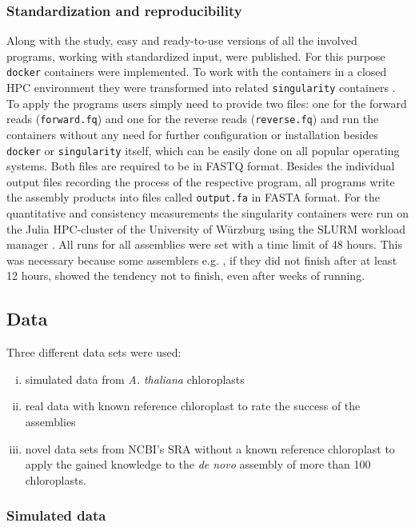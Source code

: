 \subsubsection{Standardization and reproducibility}

Along with the study, easy and ready-to-use versions of all the involved programs, working
with standardized input, were published. For this purpose \texttt{docker} containers
\cite{merkel2014docker} were implemented. To work with the containers in a closed HPC
environment they were transformed into related \texttt{singularity} containers
\cite{kurtzer2017singularity}. To apply the programs users simply need to provide two files:
one for the forward reads (\texttt{forward.fq}) and one for the reverse reads
(\texttt{reverse.fq}) and run the containers without any need for further configuration or
installation besides \texttt{docker} or \texttt{singularity} itself, which can be easily
done on all popular operating systems. Both files are required to be in FASTQ
format. Besides the individual output files recording the process of the respective
program, all programs write the assembly products into files called \texttt{output.fa} in
FASTA format. For the quantitative and consistency measurements the singularity containers
were run on the Julia HPC-cluster of the University of W\"{u}rzburg using the SLURM
workload manager \cite{Jette02slurm}. All runs for all assemblies were set with a time
limit of 48 hours. This was necessary because some assemblers e.g. \ioga, if they did not finish
after at least 12 hours, showed the tendency not to finish, even after weeks of running.

\subsection{Data}
Three different data sets were used:
\begin{enumerate}[(i)]
\item simulated data from \textit{A. thaliana} chloroplasts 
\item real data with known reference chloroplast to rate the success of the assemblies 
\item novel data sets from NCBI's SRA without a known reference chloroplast to apply the
  gained knowledge to the \textit{de novo} assembly of more than 100 chloroplasts.
\end{enumerate}
\subsubsection{Simulated data}

